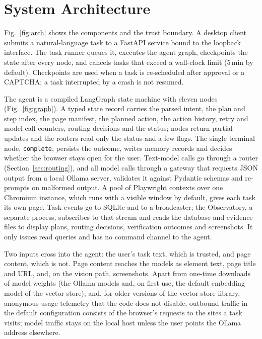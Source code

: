 \section{System Architecture}
\label{sec:arch}



Fig.~\ref{fig:arch} shows the components and the trust boundary. A desktop client submits a natural-language task to a FastAPI service bound to the loopback interface. The task runner queues it, executes the agent graph, checkpoints the state after every node, and cancels tasks that exceed a wall-clock limit (5\,min by default). Checkpoints are used when a task is re-scheduled after approval or a CAPTCHA; a task interrupted by a crash is not resumed.

The agent is a compiled LangGraph state machine with eleven nodes (Fig.~\ref{fig:graph}). A typed state record carries the parsed intent, the plan and step index, the page manifest, the planned action, the action history, retry and model-call counters, routing decisions and the status; nodes return partial updates and the routers read only the status and a few flags. The single terminal node, \texttt{complete}, persists the outcome, writes memory records and decides whether the browser stays open for the user. Text-model calls go through a router (Section~\ref{sec:routing}), and all model calls through a gateway that requests JSON output from a local Ollama server, validates it against Pydantic schemas and re-prompts on malformed output. A pool of Playwright contexts over one Chromium instance, which runs with a visible window by default, gives each task its own page. Task events go to SQLite and to a broadcaster; the Observatory, a separate process, subscribes to that stream and reads the database and evidence files to display plans, routing decisions, verification outcomes and screenshots. It only issues read queries and has no command channel to the agent.



Two inputs cross into the agent: the user's task text, which is trusted, and page content, which is not. Page content reaches the models as element text, page title and URL, and, on the vision path, screenshots. Apart from one-time downloads of model weights (the Ollama models and, on first use, the default embedding model of the vector store), and, for older versions of the vector-store library, anonymous usage telemetry that the code does not disable, outbound traffic in the default configuration consists of the browser's requests to the sites a task visits; model traffic stays on the local host unless the user points the Ollama address elsewhere.
